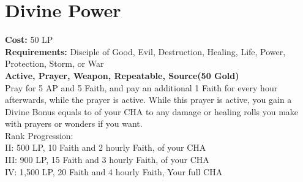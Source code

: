 \section{Divine Power}\label{prayer:divinePower}
\textbf{Cost:} 50 LP\\
\textbf{Requirements:} Disciple of Good, Evil, Destruction, Healing, Life, Power, Protection, Storm, or War\\
\textbf{Active, Prayer, Weapon, Repeatable, Source(50 Gold)}\\
Pray for 5 AP and 5 Faith, and pay an additional 1 Faith for every hour afterwards, while the prayer is active.
While this prayer is active, you gain a Divine Bonus equals to  of your CHA to any damage or healing rolls you make with prayers or wonders if you want.
\\
Rank Progression:\\
II: 500 LP, 10 Faith and 2 hourly Faith,  of your CHA\\
III: 900 LP, 15 Faith and 3 hourly Faith,  of your CHA\\
IV: 1,500 LP, 20 Faith and 4 hourly Faith, Your full CHA\\